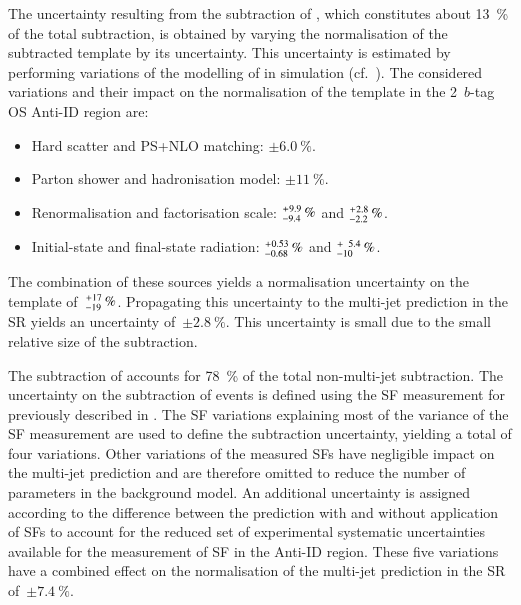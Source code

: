 The uncertainty resulting from the subtraction of \ttbarTrue, which constitutes
about \SI{13}{\percent} of the total subtraction, is obtained by varying the
normalisation of the subtracted \ttbarTrue template by its uncertainty. This
uncertainty is estimated by performing variations of the modelling of \ttbar in
simulation (cf.~). The considered variations and
their impact on the normalisation of the \ttbarTrue template in the 2~$b$-tag OS
Anti-ID region are:
\begin{itemize}
\item Hard scatter and PS+NLO matching: $\pm\SI{6.0}{\percent}$.

\item Parton shower and hadronisation model: $\pm\SI{11}{\percent}$.

\item Renormalisation and factorisation scale:
  $^{\hspace{0.25pt}+\hspace{0.25pt}9.9}_{-9.4}\,{\si{\percent}}$ and
  $^{\hspace{0.25pt}+\hspace{0.25pt}2.8}_{-2.2}\,{\si{\percent}}$.

\item Initial-state and final-state radiation:
  $^{\hspace{0.25pt}+\hspace{0.25pt}0.53}_{-0.68}\,{\si{\percent}}$ and
  $^{\hspace{0.25pt}+\hspace{0.25pt}\phantom{1}5.4}_{-10}\,{\si{\percent}}$.
\end{itemize}
The combination of these sources yields a normalisation uncertainty on the
\ttbarTrue template
of~$^{\hspace{0.25pt}+\hspace{0.25pt}17}_{-19}\,{\si{\percent}}$. Propagating
this uncertainty to the multi-jet prediction in the SR yields an uncertainty
of~$\pm \SI{2.8}{\percent}$. This uncertainty is small due to the small relative
size of the \ttbarTrue subtraction.

The subtraction of \ttbarFakes accounts for \SI{78}{\percent} of the total
non-multi-jet subtraction. The uncertainty on the subtraction of \ttbarFake
events is defined using the \ttbarFakes SF measurement for \antitau previously
described in . The SF variations explaining most
of the variance of the SF measurement are used to define the \ttbarFakes
subtraction uncertainty, yielding a total of four variations. Other variations
of the measured SFs have negligible impact on the multi-jet prediction and are
therefore omitted to reduce the number of parameters in the background model. An
additional uncertainty is assigned according to the difference between the
\ttbarFakes prediction with and without application of SFs to account for the
reduced set of experimental systematic uncertainties available for the
measurement of \ttbarFakes SF in the Anti-ID region. These five variations have
a combined effect on the normalisation of the multi-jet prediction in the SR
of~$\pm\SI{7.4}{\percent}$.

